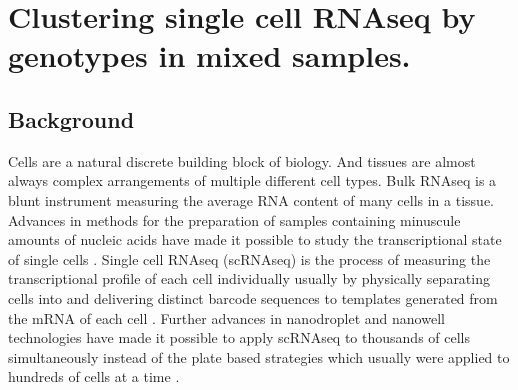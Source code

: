 
\chapter{Clustering single cell RNAseq by genotypes in mixed samples.}

\ifpdf
    \graphicspath{{Chapter2/Figs/Raster/}{Chapter2/Figs/PDF/}{Chapter2/Figs/}}
\else
    \graphicspath{{Chapter2/Figs/Vector/}{Chapter2/Figs/}}
\fi



\section{Background}
\par{
Cells are a natural discrete building block of biology. And tissues are almost always complex arrangements of multiple different cell types. Bulk RNAseq is a blunt 
instrument measuring the average RNA content of many cells in a tissue. 
Advances in methods for the preparation of samples containing minuscule amounts of nucleic acids have made it possible to study the transcriptional state of single cells \cite{first_singlecell}.
Single cell RNAseq (scRNAseq) is the process of measuring the transcriptional profile of each cell individually usually by physically separating cells into and delivering distinct barcode sequences to templates generated from the mRNA of each cell \cite{smartseq2}.
Further advances in nanodroplet and nanowell technologies have made it possible to apply scRNAseq to thousands of cells simultaneously \cite{dropseq}\cite{10xsinglecell}\cite{seqwell} instead of the plate based strategies which usually were applied to hundreds of cells at a time \cite{smartseq2}. 
}






